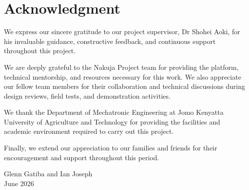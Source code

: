 \section*{Acknowledgment}

We express our sincere gratitude to our project supervisor, Dr Shohei Aoki, for
his invaluable guidance, constructive feedback, and continuous support throughout
this project.

We are deeply grateful to the Nakuja Project team for providing the platform,
technical mentorship, and resources necessary for this work. We also appreciate
our fellow team members for their collaboration and technical discussions during
design reviews, field tests, and demonstration activities.

We thank the Department of Mechatronic Engineering at Jomo Kenyatta University
of Agriculture and Technology for providing the facilities and academic
environment required to carry out this project.

Finally, we extend our appreciation to our families and friends for their
encouragement and support throughout this period.

\vspace{1cm}
\noindent Glenn Gatiba and Ian Joseph\\
June 2026
